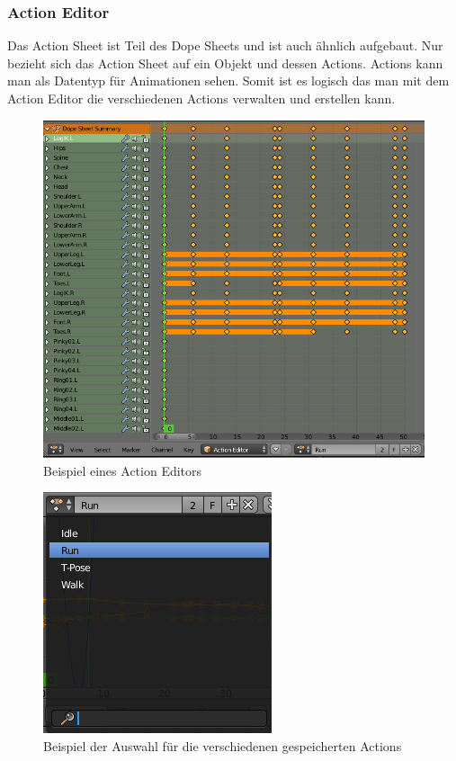 \subsubsection{Action Editor}
Das Action Sheet ist Teil des Dope Sheets und ist auch ähnlich aufgebaut. Nur bezieht sich das Action Sheet auf ein Objekt und dessen Actions.
Actions kann man als Datentyp für Animationen sehen. Somit ist es logisch das man mit dem Action Editor die verschiedenen Actions verwalten und erstellen kann.
\citep{Blender:ActionEditor}
\citep{Blender:Actions}

\begin{figure}[H]
                \centering

                \includegraphics[width=.8\textwidth]{images/animation_action_editor.PNG}
                \caption{Beispiel eines Action Editors}
\end{figure}

\begin{figure}[H]
    \centering

    \includegraphics[width=.8\textwidth]{images/animation_action_editor_actions.PNG}
    \caption{Beispiel der Auswahl für die verschiedenen gespeicherten Actions}
\end{figure}

